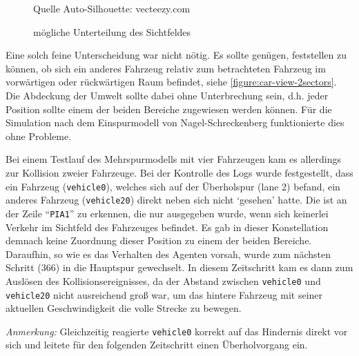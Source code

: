 \begin{figure}[hptb]
  \centering 
   \qquad 
   \qquad 
  \caption[mögliche Unterteilung des Sichtfeldes]
          {mögliche Unterteilung des Sichtfeldes}
          {\footnotesize Quelle Auto-Silhouette: vecteezy.com} 
  \label{figure:car-view-sectors}
\end{figure}

Eine solch feine Unterscheidung war nicht nötig.
Es sollte genügen, feststellen zu können, ob sich ein anderes Fahrzeug relativ zum betrachteten Fahrzeug im vorwärtigen oder rückwärtigen Raum befindet, siehe \cref{figure:car-view-2sectors}. 
Die Abdeckung der Umwelt sollte dabei ohne Unterbrechung sein, d.h. jeder Position sollte einem der beiden Bereiche zugewiesen werden können.
Für die Simulation nach dem Einspurmodell von Nagel-Schreckenberg funktionierte dies ohne Probleme.

Bei einem Testlauf des Mehrspurmodells mit vier Fahrzeugen kam es allerdings zur Kollision zweier Fahrzeuge. 
Bei der Kontrolle des Logs wurde festgestellt, dass ein Fahrzeug (\texttt{vehicle0}), welches sich auf der Überholspur (lane 2) befand, ein anderes Fahrzeug (\texttt{vehicle20}) direkt neben sich nicht \enquote*{gesehen} hatte. 
Die ist an der Zeile \enquote{\texttt{PIA1}} zu erkennen, die nur ausgegeben wurde, wenn sich keinerlei Verkehr im Sichtfeld des Fahrzeuges befindet.
Es gab in dieser Konstellation demnach keine Zuordnung dieser Position zu einem der beiden Bereiche.
Daraufhin, so wie es das Verhalten des Agenten vorsah, wurde zum nächsten Schritt (366) in die Hauptspur gewechselt. 
In diesem Zeitschritt kam es dann zum Auslösen des Kollisionsereignisses, da der Abstand zwischen \texttt{vehicle0} und \texttt{vehicle20} nicht ausreichend groß war, um das hintere Fahrzeug mit seiner aktuellen Geschwindigkeit die volle Strecke zu bewegen.

\textit{Anmerkung:} Gleichzeitig reagierte \texttt{vehicle0} korrekt auf das Hindernis direkt vor sich und leitete für den folgenden Zeitschritt einen Überholvorgang ein.

